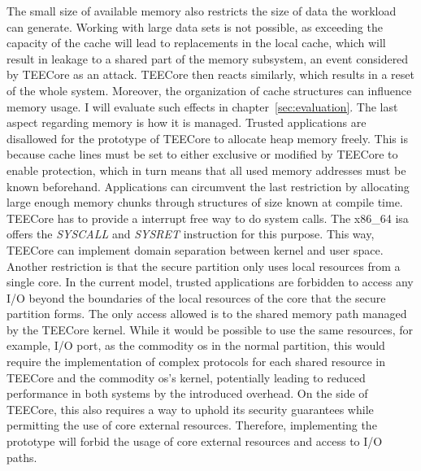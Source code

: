 The small size of available memory also restricts the size of data the workload
can generate. Working with large data sets is not possible, as exceeding the
capacity of the cache will lead to replacements in the local cache, which will
result in leakage to a shared part of the memory subsystem, an event considered
by TEECore as an attack. TEECore then reacts similarly, which results in a reset
of the whole system. Moreover, the organization of cache structures can
influence memory usage. I will evaluate such effects in
chapter~\ref{sec:evaluation}. The last aspect regarding memory is how it is
managed. Trusted applications are disallowed for the prototype of TEECore to
allocate heap memory freely. This is because cache lines must be set to either
exclusive or modified by TEECore to enable protection, which in turn means that
all used memory addresses must be known beforehand. Applications can circumvent
the last restriction by allocating large enough memory chunks through structures
of size known at compile time. TEECore has to provide a interrupt free way to do
system calls. The x86\_64 \gls{isa} offers the \textit{SYSCALL} and
\textit{SYSRET} instruction for this purpose. This way, TEECore can implement
domain separation between kernel and user space.\\

Another restriction is that the secure partition only uses local resources from
a single core. In the current model, trusted applications are forbidden to
access any I/O beyond the boundaries of the local resources of the core that the
secure partition forms. The only access allowed is to the shared memory path
managed by the TEECore kernel. While it would be possible to use the same
resources, for example, I/O port, as the commodity \gls{os} in the normal
partition, this would require the implementation of complex protocols for each
shared resource in TEECore and the commodity \gls{os}'s kernel, potentially
leading to reduced performance in both systems by the introduced overhead. On
the side of TEECore, this also requires a way to uphold its security guarantees
while permitting the use of core external resources. Therefore, implementing the
prototype will forbid the usage of core external resources and access to I/O
paths.

